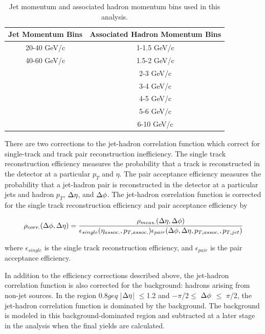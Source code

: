 \begin{table}
    \centering
    \begin{tabular}{|c||c|}
        \hline
        Jet Momentum Bins & Associated Hadron Momentum Bins \\
        \hline
        20-40 GeV/c & 1-1.5 GeV/c \\
        40-60 GeV/c & 1.5-2 GeV/c \\
        & 2-3 GeV/c \\
        & 3-4 GeV/c \\
        & 4-5 GeV/c \\
        & 5-6 GeV/c \\
        & 6-10 GeV/c \\
        \hline
    \end{tabular}
    \caption{Jet momentum and associated hadron momentum bins used in this analysis.}\label{tab:jetHadronBins}
\end{table}

There are two corrections to the jet-hadron correlation function which correct for single-track and track pair reconstruction inefficiency. The single track reconstruction efficiency measures the probability that a track is reconstructed in the detector at a particular $p_T$ and $\eta$. The pair acceptance efficiency measures the probability that a jet-hadron pair is reconstructed in the detector at a particular jets and hadron $p_T$, $\Delta \eta$, and $\Delta \phi$.  The jet-hadron correlation function is corrected for the single track reconstruction efficiency and pair acceptance efficiency by

\begin{equation}
    \rho_{corr.}(\Delta \phi, \Delta \eta) = \frac{\rho_{meas.}(\Delta \eta, \Delta \phi)}{\epsilon_{single}(\eta_{assoc.}, p_{T,assoc.}) \epsilon_{pair}(\Delta \phi, \Delta \eta, p_{T,assoc.}, p_{T,jet})}
\end{equation}

\noindent where $\epsilon_{single}$ is the single track reconstruction efficiency, and $\epsilon_{pair}$ is the pair acceptance efficiency.

In addition to the efficiency corrections described above, the jet-hadron correlation function is also corrected for the background: hadrons arising from non-jet sources. In the region 0.8$geq$ |$\Delta \eta$| $\leq$1.2 and $-\pi$/2$\leq$ $\Delta \phi$ $\leq$ $\pi$/2, the jet-hadron correlation function is dominated by the background. The background is modeled in this background-dominated region and subtracted at a later stage in the analysis when the final yields are calculated.

